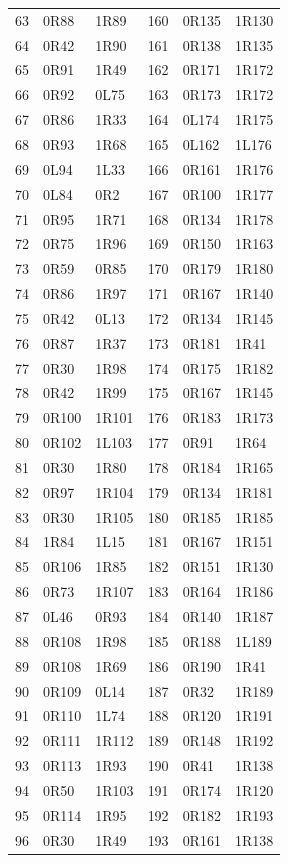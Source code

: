 {\begin{longtable}{rll@{\hspace{0.7in}}rll}
63 & 0R88 & 1R89 & 160 & 0R135 & 1R130\\
64 & 0R42 & 1R90 & 161 & 0R138 & 1R135\\
65 & 0R91 & 1R49 & 162 & 0R171 & 1R172\\
66 & 0R92 & 0L75 & 163 & 0R173 & 1R172\\
67 & 0R86 & 1R33 & 164 & 0L174 & 1R175\\
68 & 0R93 & 1R68 & 165 & 0L162 & 1L176\\
69 & 0L94 & 1L33 & 166 & 0R161 & 1R176\\
70 & 0L84 & 0R2 & 167 & 0R100 & 1R177\\
71 & 0R95 & 1R71 & 168 & 0R134 & 1R178\\
72 & 0R75 & 1R96 & 169 & 0R150 & 1R163\\
73 & 0R59 & 0R85 & 170 & 0R179 & 1R180\\
74 & 0R86 & 1R97 & 171 & 0R167 & 1R140\\
75 & 0R42 & 0L13 & 172 & 0R134 & 1R145\\
76 & 0R87 & 1R37 & 173 & 0R181 & 1R41\\
77 & 0R30 & 1R98 & 174 & 0R175 & 1R182\\
78 & 0R42 & 1R99 & 175 & 0R167 & 1R145\\
79 & 0R100 & 1R101 & 176 & 0R183 & 1R173\\
80 & 0R102 & 1L103 & 177 & 0R91 & 1R64\\
81 & 0R30 & 1R80 & 178 & 0R184 & 1R165\\
82 & 0R97 & 1R104 & 179 & 0R134 & 1R181\\
83 & 0R30 & 1R105 & 180 & 0R185 & 1R185\\
84 & 1R84 & 1L15 & 181 & 0R167 & 1R151\\
85 & 0R106 & 1R85 & 182 & 0R151 & 1R130\\
86 & 0R73 & 1R107 & 183 & 0R164 & 1R186\\
87 & 0L46 & 0R93 & 184 & 0R140 & 1R187\\
88 & 0R108 & 1R98 & 185 & 0R188 & 1L189\\
89 & 0R108 & 1R69 & 186 & 0R190 & 1R41\\
90 & 0R109 & 0L14 & 187 & 0R32 & 1R189\\
91 & 0R110 & 1L74 & 188 & 0R120 & 1R191\\
92 & 0R111 & 1R112 & 189 & 0R148 & 1R192\\
93 & 0R113 & 1R93 & 190 & 0R41 & 1R138\\
94 & 0R50 & 1R103 & 191 & 0R174 & 1R120\\
95 & 0R114 & 1R95 & 192 & 0R182 & 1R193\\
96 & 0R30 & 1R49 & 193 & 0R161 & 1R138\\
\bottomrule\end{longtable}}
